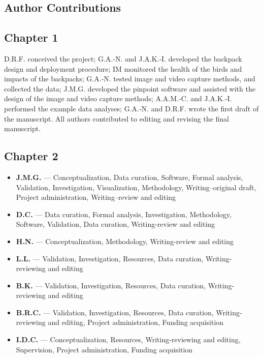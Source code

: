 \documentclass[11pt,a4paper,oneside]{book}
\begin{document}
\begin{doublespace}
\chapter*{Author Contributions}

\section*{Chapter 1}
D.R.F. conceived the project; G.A.‐N. and J.A.K.‐I. developed the backpack design and deployment procedure; IM monitored the health of the birds and impacts of the backpacks; G.A.‐N. tested image and video capture methods, and collected the data; J.M.G. developed the pinpoint software and assisted with the design of the image and video capture methods; A.A.M.‐C. and J.A.K.‐I. performed the example data analyses; G.A.‐N. and D.R.F. wrote the first draft of the manuscript. All authors contributed to editing and revising the final manuscript.

\section*{Chapter 2}
\begin{itemize}
\item \textbf{J.M.G.} --- Conceptualization, Data curation, Software, Formal analysis, Validation, Investigation, Visualization, Methodology, Writing--original draft, Project administration, Writing--review and editing
\item \textbf{D.C.} --- Data curation, Formal analysis, Investigation, Methodology, Software, Validation, Data curation, Writing-review and editing
\item \textbf{H.N.} --- Conceptualization, Methodology, Writing-review and editing
\item \textbf{L.L.} --- Validation, Investigation, Resources, Data curation, Writing-reviewing and editing
\item \textbf{B.K.} --- Validation, Investigation, Resources, Data curation, Writing-reviewing and editing
\item \textbf{B.R.C.} --- Validation, Investigation, Resources, Data curation, Writing-reviewing and editing, Project administration, Funding acquisition
\item \textbf{I.D.C.} --- Conceptualization, Resources, Writing-reviewing and editing, Supervision, Project administration, Funding acquisition
\end{itemize}


\end{doublespace}
\end{document}
